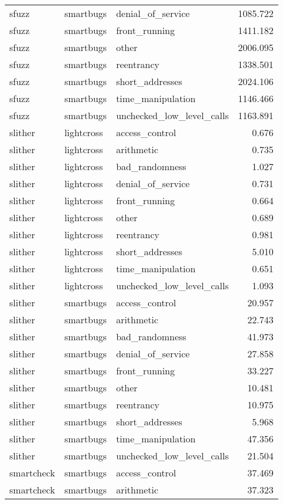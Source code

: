 \begin{tabular}[t]{lllr}
sfuzz & smartbugs & denial\_of\_service & 1085.722\\
sfuzz & smartbugs & front\_running & 1411.182\\
\addlinespace
sfuzz & smartbugs & other & 2006.095\\
sfuzz & smartbugs & reentrancy & 1338.501\\
sfuzz & smartbugs & short\_addresses & 2024.106\\
sfuzz & smartbugs & time\_manipulation & 1146.466\\
sfuzz & smartbugs & unchecked\_low\_level\_calls & 1163.891\\
\addlinespace
slither & lightcross & access\_control & 0.676\\
slither & lightcross & arithmetic & 0.735\\
slither & lightcross & bad\_randomness & 1.027\\
slither & lightcross & denial\_of\_service & 0.731\\
slither & lightcross & front\_running & 0.664\\
\addlinespace
slither & lightcross & other & 0.689\\
slither & lightcross & reentrancy & 0.981\\
slither & lightcross & short\_addresses & 5.010\\
slither & lightcross & time\_manipulation & 0.651\\
slither & lightcross & unchecked\_low\_level\_calls & 1.093\\
\addlinespace
slither & smartbugs & access\_control & 20.957\\
slither & smartbugs & arithmetic & 22.743\\
slither & smartbugs & bad\_randomness & 41.973\\
slither & smartbugs & denial\_of\_service & 27.858\\
slither & smartbugs & front\_running & 33.227\\
\addlinespace
slither & smartbugs & other & 10.481\\
slither & smartbugs & reentrancy & 10.975\\
slither & smartbugs & short\_addresses & 5.968\\
slither & smartbugs & time\_manipulation & 47.356\\
slither & smartbugs & unchecked\_low\_level\_calls & 21.504\\
\addlinespace
smartcheck & smartbugs & access\_control & 37.469\\
smartcheck & smartbugs & arithmetic & 37.323\\

\end{tabular}
